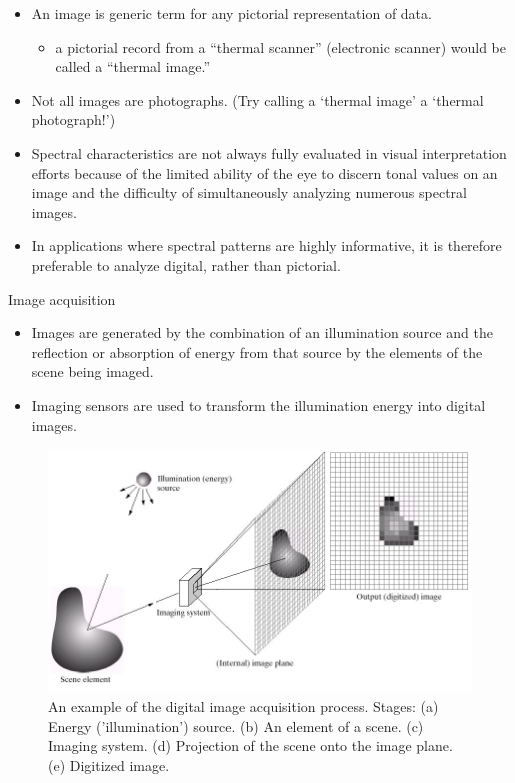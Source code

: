 \documentclass[10pt,dvipsnames,ignorenonframetext,aspectratio=169]{beamer}
\providecommand{\tightlist}{%
  \setlength{\itemsep}{0pt}\setlength{\parskip}{0pt}}
\begin{document}
\begin{frame}{}
\protect\hypertarget{section-6}{}
\begin{itemize}
\tightlist
\item
  An image is generic term for any pictorial representation of data.

  \begin{itemize}
  \tightlist
  \item
    a pictorial record from a ``thermal scanner'' (electronic scanner)
    would be called a ``thermal image.''
  \end{itemize}
\item
  Not all images are photographs. (Try calling a `thermal image' a
  `thermal photograph!')
\item
  Spectral characteristics are not always fully evaluated in visual
  interpretation efforts because of the limited ability of the eye to
  discern tonal values on an image and the difficulty of simultaneously
  analyzing numerous spectral images.
\item
  In applications where spectral patterns are highly informative, it is
  therefore preferable to analyze digital, rather than pictorial.
\end{itemize}
\end{frame}

\begin{frame}{Image acquisition}
\protect\hypertarget{image-acquisition}{}
\scriptsize

\begin{itemize}
\tightlist
\item
  Images are generated by the combination of an
  \alert{illumination source} and the reflection or absorption of energy
  from that source by the elements of the \alert{scene} being imaged.
\item
  Imaging sensors are used to transform the illumination energy into
  digital images.
\end{itemize}

\begin{figure}
\includegraphics[width=0.6\linewidth]{../images/generation_of_digital_image} \caption{An example of the digital image acquisition process. Stages: (a) Energy ('illumination') source. (b) An element of a scene. (c) Imaging system. (d) Projection of the scene onto the image plane. (e) Digitized image.}\label{fig:imaging-sensors}
\end{figure}
\end{frame}
\end{document}
